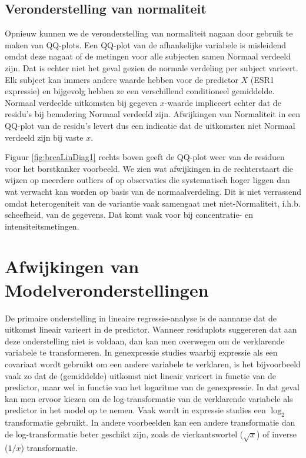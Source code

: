 \documentclass[
  12pt,dutch,coursenotes]{book}
\begin{document}
\hypertarget{veronderstelling-van-normaliteit}{%
\subsection{Veronderstelling van normaliteit}\label{veronderstelling-van-normaliteit}}

Opnieuw kunnen we de veronderstelling van normaliteit nagaan door gebruik te maken van QQ-plots. Een QQ-plot van de afhankelijke variabele is misleidend omdat deze nagaat of de metingen voor alle subjecten samen Normaal verdeeld zijn. Dat is echter niet het geval gezien de normale verdeling per subject varieert.
Elk subject kan immers andere waarde hebben voor de predictor \(X\) (ESR1 expressie) en bijgevolg hebben ze een verschillend conditioneel gemiddelde.
Normaal verdeelde uitkomsten bij gegeven \(x\)-waarde impliceert echter dat de
residu's bij benadering Normaal verdeeld zijn.
Afwijkingen van Normaliteit in een QQ-plot van de residu's levert dus een indicatie dat de uitkomsten niet Normaal
verdeeld zijn bij vaste \(x\).

Figuur \ref{fig:brcaLinDiag1} rechts boven geeft de QQ-plot weer van de residuen voor het borstkanker voorbeeld.
We zien wat afwijkingen in de rechterstaart die wijzen op meerdere outliers of op observaties die systematisch hoger liggen dan wat verwacht kan worden op basis van de normaalverdeling.
Dit is niet verrassend omdat heterogeniteit van de variantie vaak samengaat met niet-Normaliteit, i.h.b. scheefheid, van de gegevens.
Dat komt vaak voor bij concentratie- en intensiteitsmetingen.

\hypertarget{afwijkingen-van-modelveronderstellingen}{%
\section{Afwijkingen van Modelveronderstellingen}\label{afwijkingen-van-modelveronderstellingen}}

De primaire onderstelling in lineaire regressie-analyse is de aanname dat de uitkomst lineair varieert in de predictor.
Wanneer residuplots suggereren dat aan deze onderstelling niet is voldaan, dan kan men overwegen om de verklarende variabele te transformeren. In genexpressie studies waarbij expressie als een covariaat wordt gebruikt om een andere variabele te verklaren, is het bijvoorbeeld vaak zo dat de (gemiddelde) uitkomst niet lineair varieert in functie van de predictor, maar wel in functie van het logaritme van de genexpressie. In dat geval kan men ervoor kiezen om de log-transformatie van de verklarende variabele als predictor in het model op te nemen. Vaak wordt in expressie studies een \(\log_2\) transformatie gebruikt. In andere voorbeelden kan een andere transformatie dan de
log-transformatie beter geschikt zijn, zoals de vierkantswortel (\(\sqrt{x}\)) of inverse (\(1/x\)) transformatie.
\end{document}

